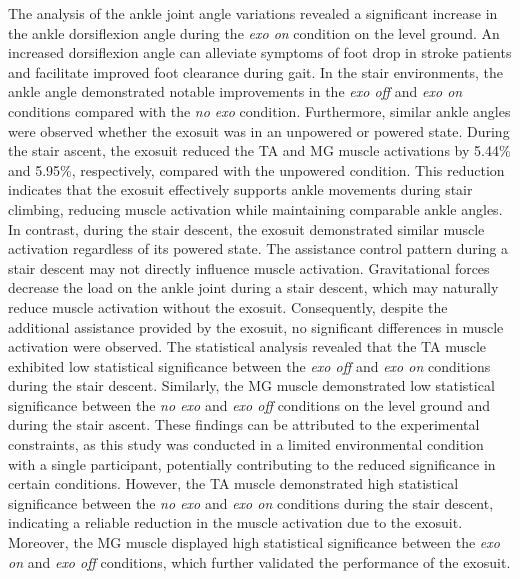 \documentclass[actuators,article,accept,pdftex,moreauthors]{Definitions/mdpi}
\begin{document}
The analysis of the ankle joint angle variations revealed a significant increase in the ankle dorsiflexion angle during the \textit{exo on} condition on the level ground. An increased dorsiflexion angle can alleviate symptoms of foot drop in stroke patients and facilitate improved foot clearance during gait. In the stair environments, the ankle angle demonstrated notable improvements in the \textit{exo off} and \textit{exo on} conditions compared with the \textit{no exo} condition. {Furthermore}, similar ankle angles were observed whether the exosuit was in an unpowered or powered state. During the stair ascent, the exosuit reduced the TA and MG muscle activations by 5.44\% and 5.95\%, respectively, compared with the unpowered condition. This reduction indicates that the exosuit effectively supports ankle movements during stair climbing, reducing muscle activation while maintaining comparable ankle angles. In contrast, during the stair descent, the exosuit demonstrated similar muscle activation regardless of its powered state. The assistance control pattern during a stair descent may not directly influence muscle activation. Gravitational forces decrease the load on the ankle joint during a stair descent, which may naturally reduce muscle activation without the exosuit. Consequently, despite the additional assistance provided by the exosuit, no significant differences in muscle activation were observed.
{The statistical analysis revealed that the TA muscle exhibited low statistical significance between the \textit{exo off} and \textit{exo on} conditions during the stair descent. Similarly, the MG muscle demonstrated low statistical significance between the \textit{no exo} and \textit{exo off} conditions on the level ground and during the stair ascent. These findings can be attributed to the experimental constraints, as this study was conducted in a limited environmental condition with a single participant, potentially contributing to the reduced significance in certain conditions. However, the TA muscle demonstrated high statistical significance between the \textit{no exo} and \textit{exo on} conditions during the stair descent, indicating a reliable reduction in the muscle activation due to the exosuit. Moreover, the MG muscle displayed high statistical significance between the \textit{exo on} and \textit{exo off} conditions, which further validated the performance of the exosuit.}
\end{document}
